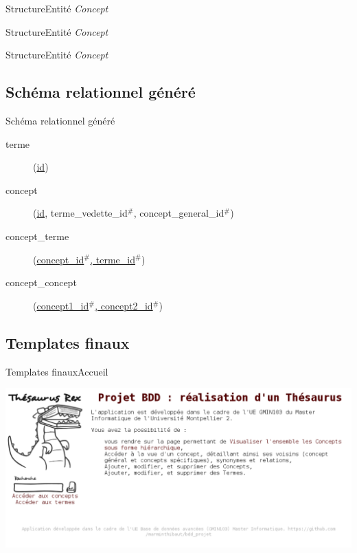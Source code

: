 \begin{frame}{Structure}{Entité \emph{Concept}}

\end{frame}

\begin{frame}{Structure}{Entité \emph{Concept}}

\end{frame}

\begin{frame}{Structure}{Entité \emph{Concept}}

\end{frame}

\subsection{Schéma relationnel généré}
\begin{frame}{Schéma relationnel généré}
\begin{description}
\item[terme](\underline{id})
\item[concept](\underline{id}, terme\_vedette\_id$^\#$, concept\_general\_id$^\#$)
\item[concept\_terme](\underline{concept\_id$^\#$, terme\_id$^\#$})
\item[concept\_concept](\underline{concept1\_id$^\#$, concept2\_id$^\#$})
\end{description}
\end{frame}

\subsection{Templates finaux}
\begin{frame}{Templates finaux}{Accueil}
\begin{center}
\includegraphics[width=\textwidth]{files/screen_accueil}
\end{center}
\end{frame}

